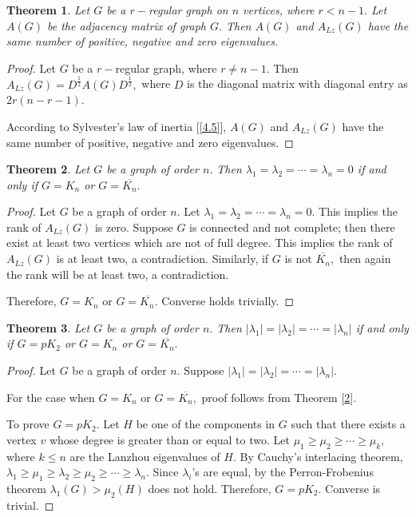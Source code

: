 \documentclass[10pt,a4paper,oneside]{article}
\newtheorem{theorem}{Theorem}
\begin{document}
\begin{theorem}\label{4.9}
	Let $G$ be a $r-$regular graph on $n$ vertices, where $r<n-1.$ Let $A(G)$ be the adjacency matrix of graph $G.$ Then $A(G)$ and $A_{Lz}(G)$ have the same number of positive, negative and zero eigenvalues.
\end{theorem}
\begin{proof}
	Let $G$ be a $r-$regular graph, where $r\neq n-1.$ Then $A_{Lz}(G)=D^{\frac{1}{2}}A(G)D^{\frac{1}{2}},$ where $D$ is the diagonal matrix with diagonal entry as $2r(n-r-1).$ 
	
	According to Sylvester's law of inertia [\ref{4.5}], $A(G)$ and $A_{Lz}(G)$ have the same number of positive, negative and zero eigenvalues.
\end{proof}
\begin{theorem}\label{4.10}
Let $G$ be a graph of order $n.$ Then $\lambda_1=\lambda_2=\cdots=\lambda_n=0$ if and only if $G=K_n$ or $G=\overline{K_n}.$
\end{theorem}
\begin{proof}
Let $G$ be a graph of order $n.$ Let $\lambda_1=\lambda_2=\cdots=\lambda_n=0.$ This implies the rank of $A_{Lz}(G)$ is zero. Suppose $G$ is connected and not complete; then there exist at least two vertices which are not of full degree. This implies the rank of $A_{Lz}(G)$ is at least two, a contradiction. Similarly, if $G$ is not $\overline{K_n},$ then again the rank will be at least two, a contradiction.
	

Therefore, $G=K_n$ or $G =\overline{K_n}.$ Converse holds trivially.
\end{proof}
\begin{theorem}
	Let $G$ be a graph of order $n.$ Then $\vert \lambda_1\vert=\vert\lambda_2\vert=\cdots=\vert\lambda_n\vert$ if and only if $G=pK_2$ or $G=K_n$ or $G=\overline{K_n}.$ 
\end{theorem}
\begin{proof}
	Let $G$ be a graph of order $n.$ Suppose $\vert \lambda_1\vert=\vert\lambda_2\vert=\cdots=\vert\lambda_n\vert.$
	
	
	For the case when $G=K_n$ or $G=\overline{K_n},$ proof follows from Theorem [\ref{4.10}].
	
	
	To prove $G=pK_2.$ Let $H$ be one of the components in $G$ such that there exists a vertex $v$ whose degree is greater than or equal to two. Let $\mu_1\geq \mu_2\geq \cdots\geq \mu_k,$ where $k\leq n$ are the Lanzhou eigenvalues of $H.$ By Cauchy's interlacing theorem, $\lambda_1\geq \mu_1\geq \lambda_2\geq \mu_2\geq \cdots \geq \lambda_n.$ Since $\lambda_i$'s are equal, by the Perron-Frobenius theorem $\lambda_1(G)> \mu_2(H)$ does not hold. Therefore, $G=pK_2.$ Converse is trivial.
\end{proof}
\end{document}

